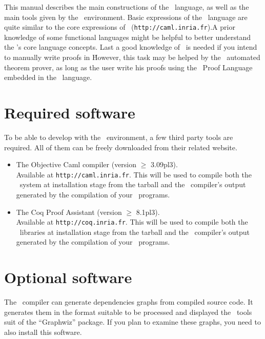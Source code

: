 This manual describes the main constructions of the \focal\ language,
as well as the main tools given by the \focal\ environment. Basic
expressions of the \focal\ language are quite similar to the core
expressions of \ocaml\
({\tt http://caml.inria.fr}).A prior knowledge of some functional
languages might be helpful to better understand the \focal's core
language concepts. Last a good knowledge of \coq\ is needed if you
intend to manually write proofs in \focal\. However, this task may be
helped by the \zenon\ automated theorem prover, as long as the user
write his proofs using the \focal\ Proof Language embedded in the
\focal\ language.



\section{Required software}
To be able to develop with the \focal\ environment, a few third party
tools are required. All of them can be freely downloaded from their
related website.
\begin{itemize}
  \item The Objective Caml compiler (version $\geq$ 3.09pl3). \\
    Available
    at {\tt http://caml.inria.fr}. This will be used to compile both
    the \focal\ system at installation stage from the tarball and
    the \focal\ compiler's output generated by the compilation of
    your \focal\ programs.

  \item The Coq Proof Assistant (version $\geq$ 8.1pl3). \\
     Available at
    {\tt http://coq.inria.fr}. This will be used to compile both
    the \focal\ libraries at installation stage from the tarball and
    the \focal\ compiler's output generated by the compilation of
    your \focal\ programs.
\end{itemize}



\section{Optional software}
The \focal\ compiler can generate dependencies graphs from compiled
source code. It generates them in the format suitable to be processed
and displayed the \dotty\ tools suit of the ``Graphwiz'' package. If
you plan to examine these graphs, you need to also install this
software.



